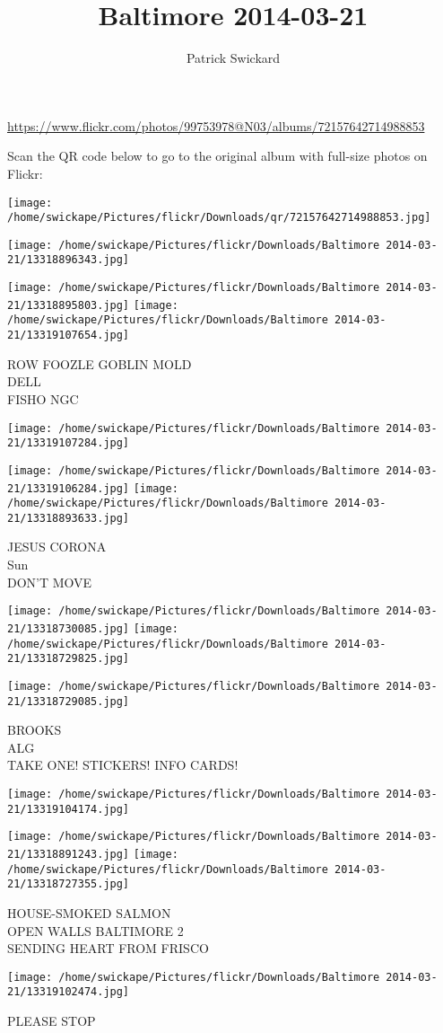 \documentclass[10pt,letterpaper]{article}
\title{Baltimore 2014-03-21}
\author{Patrick Swickard}
\date{}
\begin{document}
\maketitle

\url{https://www.flickr.com/photos/99753978@N03/albums/72157642714988853}

Scan the QR code below to go to the original album with full-size photos on Flickr:

\texttt{[image: /home/swickape/Pictures/flickr/Downloads/qr/72157642714988853.jpg]}
\pagebreak

\texttt{[image: /home/swickape/Pictures/flickr/Downloads/Baltimore 2014-03-21/13318896343.jpg]}

\vspace{0.25in}
\texttt{[image: /home/swickape/Pictures/flickr/Downloads/Baltimore 2014-03-21/13318895803.jpg]}
\texttt{[image: /home/swickape/Pictures/flickr/Downloads/Baltimore 2014-03-21/13319107654.jpg]}

ROW FOOZLE GOBLIN MOLD\\
DELL\\
FISHO NGC
\pagebreak

\texttt{[image: /home/swickape/Pictures/flickr/Downloads/Baltimore 2014-03-21/13319107284.jpg]}

\vspace{0.25in}
\texttt{[image: /home/swickape/Pictures/flickr/Downloads/Baltimore 2014-03-21/13319106284.jpg]}
\texttt{[image: /home/swickape/Pictures/flickr/Downloads/Baltimore 2014-03-21/13318893633.jpg]}

JESUS CORONA\\
Sun\\
DON'T MOVE
\pagebreak

\texttt{[image: /home/swickape/Pictures/flickr/Downloads/Baltimore 2014-03-21/13318730085.jpg]}
\texttt{[image: /home/swickape/Pictures/flickr/Downloads/Baltimore 2014-03-21/13318729825.jpg]}

\texttt{[image: /home/swickape/Pictures/flickr/Downloads/Baltimore 2014-03-21/13318729085.jpg]}

BROOKS\\
ALG\\
TAKE ONE!  STICKERS!  INFO CARDS!
\pagebreak

\texttt{[image: /home/swickape/Pictures/flickr/Downloads/Baltimore 2014-03-21/13319104174.jpg]}

\vspace{0.25in}
\texttt{[image: /home/swickape/Pictures/flickr/Downloads/Baltimore 2014-03-21/13318891243.jpg]}
\texttt{[image: /home/swickape/Pictures/flickr/Downloads/Baltimore 2014-03-21/13318727355.jpg]}

HOUSE{-}SMOKED SALMON\\
OPEN WALLS BALTIMORE 2\\
SENDING HEART FROM FRISCO
\pagebreak

\texttt{[image: /home/swickape/Pictures/flickr/Downloads/Baltimore 2014-03-21/13319102474.jpg]}

PLEASE STOP
\pagebreak
\end{document}
